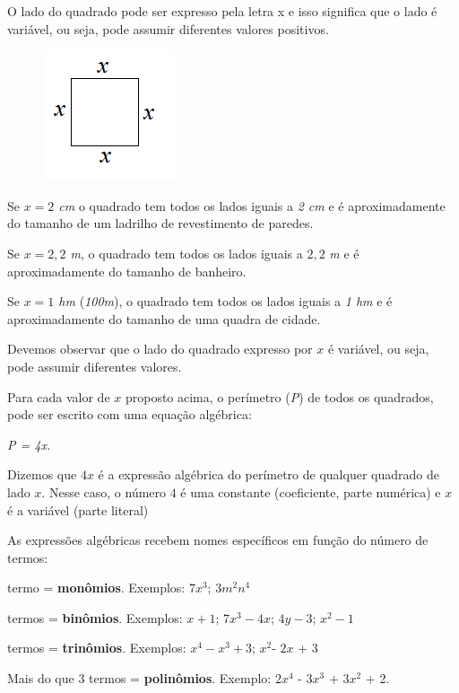 \vspace{5mm}

\settowidth{}
\begin{description}[leftmargin=\dimexpr\widest+\labelsep\relax,labelindent=0pt,
    labelwidth=\widest]
\item[\textbf{Exemplo~\thesubsection.\theexemplo~-}]

\noindent O lado do quadrado pode ser expresso pela letra  x  e isso significa que o lado é variável, ou seja, pode assumir diferentes valores positivos.

\begin{figure}[H]
\includegraphics{capitulos/expressoes_algebricas/media/image2.png}
\centering
\end{figure}

\noindent Se \textit{$x = 2$ cm} o quadrado tem todos os lados iguais a \textit{2 cm} e é aproximadamente do tamanho de um ladrilho de revestimento de paredes.

\noindent Se \textit{$x = 2,2$ m}, o quadrado tem todos os lados iguais a $2,2$ \textit{m} e é aproximadamente do tamanho de banheiro.

\noindent Se \textit{$x = 1$ hm} (\textit{100m}), o quadrado tem todos os lados iguais a \textit{1 hm} e é aproximadamente do tamanho de uma quadra de cidade.

\noindent Devemos observar que o lado do quadrado expresso por $x$ é variável, ou seja, pode assumir diferentes valores.

\noindent Para cada valor de $x$ proposto acima, o perímetro (\textit{P}) de todos os quadrados, pode ser escrito com uma equação algébrica:

\begin{center}
\textit{P = 4x.}
\end{center}

\noindent Dizemos que $4x$ é a expressão algébrica do perímetro de qualquer quadrado de lado $x$. Nesse caso, o número $4$ é uma constante (coeficiente, parte numérica) e $x$ é a variável (parte literal) \qedsymbol

\noindent As expressões algébricas recebem nomes específicos em função do número de termos:

\setlength{\parskip}{.5em}
 termo = \textbf{monômios}. Exemplos: $7x^3$; $3m^2n^4$\par
\setlength{\parskip}{0em}
 termos = \textbf{binômios}. Exemplos:  $x+1$; $7x^3 -4x$; $4y - 3$; $x^2 - 1$\par
{} termos = \textbf{trinômios}. Exemplos: $x^4 - x^3 + 3$; $x^2$- $2x$ + 3\par
\noindent Mais do que 3 termos = \textbf{polinômios}. Exemplo: $2x^4$ - $3x^3$ + $3x^2$ + 2.

\end{description}

